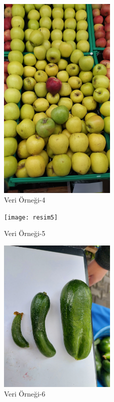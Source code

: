 \documentclass[11pt,a4paper]{report}
\begin{document}
	\begin{figure}[!h]
		
		\centering
		\includegraphics[angle=-90,width=0.5\textwidth]{resim4}
		\caption{Veri Örneği-4}
		
	\end{figure}
	\newpage
	\begin{figure}[!h]
		
		\centering
		\texttt{[image: resim5]}
		\caption{Veri Örneği-5}
		
	\end{figure}
	
	\begin{figure}[!h]
		
		\centering
		\includegraphics[angle=-90,width=0.5\textwidth]{resim6}
		\caption{Veri Örneği-6}
		
	\end{figure}
	
\end{document}
